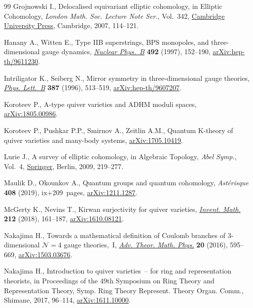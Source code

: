 \documentclass[10pt,a4paper]{amsart}
\numberwithin{equation}{section}
\begin{document}
\begin{thebibliography}{99}
Grojnowski I., Delocalised equivariant elliptic cohomology, in Elliptic
 Cohomology, \textit{London Math. Soc. Lecture Note Ser.}, Vol.~342, \href{https://doi.org/10.1017/CBO9780511721489.007}{Cambridge
 University Press}, Cambridge, 2007, 114--121.

Hanany A., Witten E., Type {IIB} superstrings, {BPS} monopoles, and
 three-dimensional gauge dynamics, \href{https://doi.org/10.1016/S0550-3213(97)00157-0}{\textit{Nuclear Phys.~B}} \textbf{492}
 (1997), 152--190, \href{https://arxiv.org/abs/hep-th/9611230}{arXiv:hep-th/9611230}.

Intriligator K., Seiberg N., Mirror symmetry in three-dimensional gauge
 theories, \href{https://doi.org/10.1016/0370-2693(96)01088-X}{\textit{Phys. Lett.~B}} \textbf{387} (1996), 513--519,
 \href{https://arxiv.org/abs/hep-th/9607207}{arXiv:hep-th/9607207}.

Koroteev P., A-type quiver varieties and ADHM moduli spaces,
 \href{https://arxiv.org/abs/1805.00986}{arXiv:1805.00986}.

Koroteev P., Pushkar P.P., Smirnov A., Zeitlin A.M., Quantum K-theory of quiver
 varieties and many-body systems, \href{https://arxiv.org/abs/1705.10419}{arXiv:1705.10419}.

Lurie J., A survey of elliptic cohomology, in Algebraic Topology, \textit{Abel
 Symp.}, Vol.~4, \href{https://doi.org/10.1007/978-3-642-01200-6_9}{Springer}, Berlin, 2009, 219--277.

Maulik D., Okounkov A., Quantum groups and quantum cohomology,
 \textit{Ast\'{e}risque} \textbf{408} (2019), ix+209~pages, \href{https://arxiv.org/abs/1211.1287}{arXiv:1211.1287}.

McGerty K., Nevins T., Kirwan surjectivity for quiver varieties,
 \href{https://doi.org/10.1007/s00222-017-0765-x}{\textit{Invent. Math.}} \textbf{212} (2018), 161--187, \href{https://arxiv.org/abs/1610.08121}{arXiv:1610.08121}.

Nakajima H., Towards a mathematical definition of {C}oulomb branches of
 3-dimensional {${\mathcal N}=4$} gauge theories,~{I}, \href{https://doi.org/10.4310/ATMP.2016.v20.n3.a4}{\textit{Adv. Theor.
 Math. Phys.}} \textbf{20} (2016), 595--669, \href{https://arxiv.org/abs/1503.03676}{arXiv:1503.03676}.

Nakajima H., Introduction to quiver varieties~-- for ring and representation
 theorists, in Proceedings of the 49th {S}ymposium on {R}ing {T}heory and
 {R}epresentation {T}heory, Symp. Ring Theory Represent. Theory Organ. Comm.,
 Shimane, 2017, 96--114, \href{https://arxiv.org/abs/1611.10000}{arXiv:1611.10000}.


\end{thebibliography}
\end{document}
